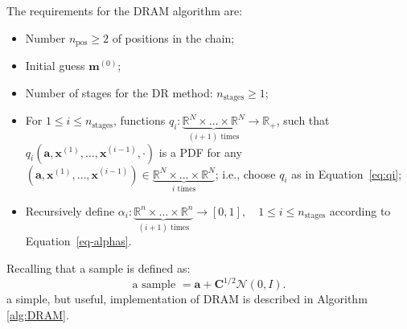 The requirements for the DRAM algorithm are:
\begin{itemize}
 \item Number $n_{\text{pos}}\geqslant 2$ of positions in the chain;
 \item Initial guess $\mathbf{m}^{(0)}$;
 \item Number of stages for the DR method: $n_{\text{stages}}\geqslant 1$;
 \item For $1\leqslant i\leqslant n_{\text{stages}}$, functions $q_i:\underbrace{\mathbb{R}^N\times\ldots\times\mathbb{R}^N}_{(i+1)\text{ times}}\rightarrow\mathbb{R}_{+}$, such that $q_i(\mathbf{a},\mathbf{x}^{(1)},\ldots,\mathbf{x}^{(i-1)},\cdot)$ is a PDF for any $(\mathbf{a},\mathbf{x}^{(1)},\ldots,\mathbf{x}^{(i-1)})\in\underbrace{\mathbb{R}^N\times\ldots\times\mathbb{R}^N}_{i\text{ times}}$; i.e., choose $q_i$ as in Equation~\eqref{eq:qi};
 \item Recursively define $\alpha_i:\underbrace{\mathbb{R}^n\times\ldots\times\mathbb{R}^n}_{(i+1)\text{ times}}\rightarrow [0,1],\quad 1\leqslant i\leqslant n_{\text{stages}}$ according to Equation~\eqref{eq-alphas}.
\end{itemize}

% 

Recalling that a sample is defined as:
\begin{equation*} %
\text{a sample } = \mathbf{a}+\mathbf{C}^{1/2}\mathcal{N}(0,I).
\end{equation*}
a simple, but useful, implementation of DRAM is described in Algorithm \ref{alg:DRAM}.
 

